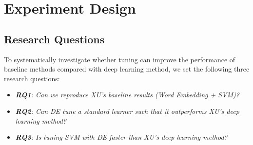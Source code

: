 \documentclass[sigconf,review, anonymous]{acmart}
\theoremstyle{break}
\newcommand{\bi}{\begin{itemize}[leftmargin=0.4cm]}
\newcommand{\ei}{\end{itemize}}
\begin{document}
 





\section{Experiment Design}\label{experiment}
\subsection{Research Questions}\label{RQ}
 To systematically investigate whether tuning can improve the 
 performance of baseline methods compared with deep learning method, we set
 the following three research questions:
 

 
 \bi
 \item {\it \textbf{RQ1}: Can we reproduce XU's baseline results (Word Embedding + SVM)?}
 \item {\it \textbf{RQ2}: Can   DE   tune a standard learner such that
 it outperforms XU's deep learning method?}
 \item {\it \textbf{RQ3}: Is tuning SVM with DE faster than XU's deep learning method?}
 \ei
 
\end{document}
